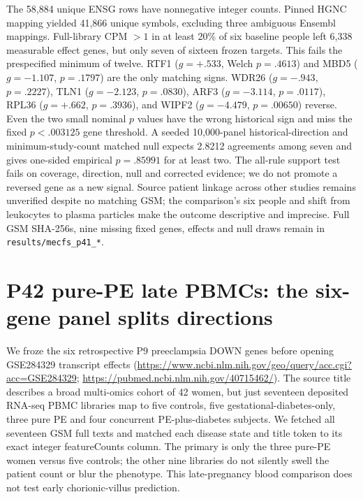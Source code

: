 \documentclass[11pt,a4paper]{article}
\begin{document}
The 58,884 unique ENSG rows have nonnegative integer counts. Pinned HGNC mapping yielded 41,866 unique symbols, excluding three ambiguous Ensembl mappings. Full-library CPM $>1$ in at least 20\% of six baseline people left 6,338 measurable effect genes, but only seven of sixteen frozen targets. This fails the prespecified minimum of twelve. RTF1 ($g=+.533$, Welch $p=.4613$) and MBD5 ($g=-1.107$, $p=.1797$) are the only matching signs. WDR26 ($g=-.943$, $p=.2227$), TLN1 ($g=-2.123$, $p=.0830$), ARF3 ($g=-3.114$, $p=.0117$), RPL36 ($g=+.662$, $p=.3936$), and WIPF2 ($g=-4.479$, $p=.00650$) reverse. Even the two small nominal $p$ values have the wrong historical sign and miss the fixed $p<.003125$ gene threshold. A seeded 10,000-panel historical-direction and minimum-study-count matched null expects 2.8212 agreements among seven and gives one-sided empirical $p=.85991$ for at least two. The all-rule support test fails on coverage, direction, null and corrected evidence; we do not promote a reversed gene as a new signal. Source patient linkage across other studies remains unverified despite no matching GSM; the comparison's six people and shift from leukocytes to plasma particles make the outcome descriptive and imprecise. Full GSM SHA-256s, nine missing fixed genes, effects and null draws remain in \texttt{results/mecfs\_p41\_*}.

\section{P42 pure-PE late PBMCs: the six-gene panel splits directions}
We froze the six retrospective P9 preeclampsia DOWN genes before opening GSE284329 transcript effects (\url{https://www.ncbi.nlm.nih.gov/geo/query/acc.cgi?acc=GSE284329}; \url{https://pubmed.ncbi.nlm.nih.gov/40715462/}). The source title describes a broad multi-omics cohort of 42 women, but just seventeen deposited RNA-seq PBMC libraries map to five controls, five gestational-diabetes-only, three pure PE and four concurrent PE-plus-diabetes subjects. We fetched all seventeen GSM full texts and matched each disease state and title token to its exact integer featureCounts column. The primary is only the three pure-PE women versus five controls; the other nine libraries do not silently swell the patient count or blur the phenotype. This late-pregnancy blood comparison does not test early chorionic-villus prediction.
\end{document}
